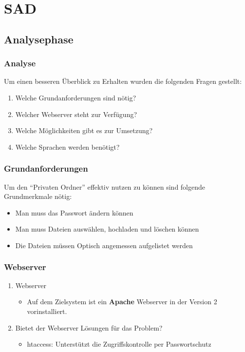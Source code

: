\section{SAD}
\subsection{Analysephase}
\begin{frame} %
  \frametitle{Analyse} %

  Um einen besseren Überblick zu Erhalten wurden die folgenden Fragen gestellt:
  \begin{enumerate}
   \item Welche Grundanforderungen sind nötig?
   \item Welcher Webserver steht zur Verfügung?
   \item Welche Möglichkeiten gibt es zur Umsetzung?
   \item Welche Sprachen werden benötigt?
  \end{enumerate}

\end{frame}

\begin{frame} %
  \frametitle{Grundanforderungen} %

   Um den "`Privaten Ordner"' effektiv nutzen zu können sind folgende Grundmerkmale nötig:
   \begin{itemize}
    \item Man muss das Passwort ändern können
    \item Man muss Dateien auswählen, hochladen und löschen können
    \item Die Dateien müssen Optisch angemessen aufgelistet werden
   \end{itemize}

\end{frame}

\begin{frame} %
  \frametitle{Webserver} %
  \begin{enumerate}
   \item Webserver
   \begin{itemize}
    \item Auf dem Zielsystem ist ein \textbf{Apache} Webserver in der Version 2 vorinstalliert.
   \end{itemize}

   \item Bietet der Webserver Lösungen für das Problem?
   \begin{itemize}
    \item htaccess: Unterstützt die Zugriffskontrolle per Passwortschutz
   \end{itemize}

  \end{enumerate}


\end{frame}

